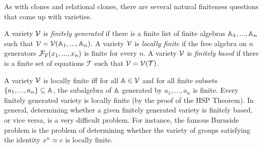 \documentclass[letterpaper,11pt]{article}
\begin{document}
As with clones and relational clones, there are several natural finiteness questions that come up with varieties.

\begin{defn} A variety $\mathcal{V}$ is \emph{finitely generated} if there is a finite list of finite algebras $\mathbb{A}_1, ..., \mathbb{A}_n$ such that $\mathcal{V} = \mathcal{V}(\mathbb{A}_1, ..., \mathbb{A}_n)$. A variety $\mathcal{V}$ is \emph{locally finite} if the free algebra on $n$ generators $\mathcal{F}_{\mathcal{V}}(x_1, ..., x_n)$ is finite for every $n$. A variety $\mathcal{V}$ is \emph{finitely based} if there is a finite set of equations $\mathcal{T}$ such that $\mathcal{V} = \mathcal{V}(\mathcal{T})$.
\end{defn}

A variety $\mathcal{V}$ is locally finite iff for all $\mathbb{A} \in \mathcal{V}$ and for all finite subsets $\{a_1, ..., a_n\} \subseteq \mathbb{A}$, the subalgebra of $\mathbb{A}$ generated by $a_1, ..., a_n$ is finite. Every finitely generated variety is locally finite (by the proof of the HSP Theorem). In general, determining whether a given finitely generated variety is finitely based, or vice versa, is a very difficult problem. For instance, the famous Burnside problem is the problem of determining whether the variety of groups satisfying the identity $x^n \approx e$ is locally finite.
\end{document}

